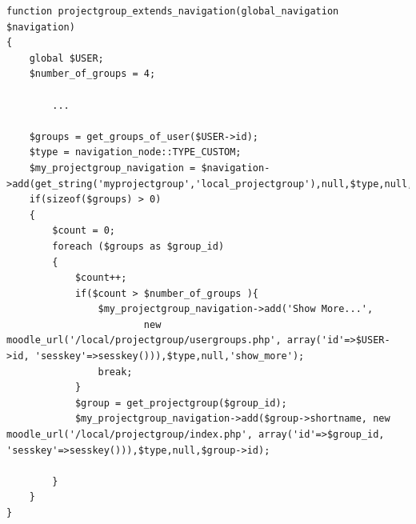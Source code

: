 \begin{lstlisting}[style=phpCode, caption=\myCaption{The code for extending the navigation}, label=moodlecodeextendingnavigation]
function projectgroup_extends_navigation(global_navigation $navigation) 
{
    global $USER;
    $number_of_groups = 4;
    
		...
    
    $groups = get_groups_of_user($USER->id);
    $type = navigation_node::TYPE_CUSTOM;
    $my_projectgroup_navigation = $navigation->add(get_string('myprojectgroup','local_projectgroup'),null,$type,null,'myprojectgroup');
    if(sizeof($groups) > 0)
    {
        $count = 0;
        foreach ($groups as $group_id) 
        {
            $count++;
            if($count > $number_of_groups ){
                $my_projectgroup_navigation->add('Show More...', 
                        new moodle_url('/local/projectgroup/usergroups.php', array('id'=>$USER->id, 'sesskey'=>sesskey())),$type,null,'show_more');
                break;
            }
            $group = get_projectgroup($group_id);
            $my_projectgroup_navigation->add($group->shortname, new moodle_url('/local/projectgroup/index.php', array('id'=>$group_id, 'sesskey'=>sesskey())),$type,null,$group->id);
            
        }
    }
}
\end{lstlisting}




















